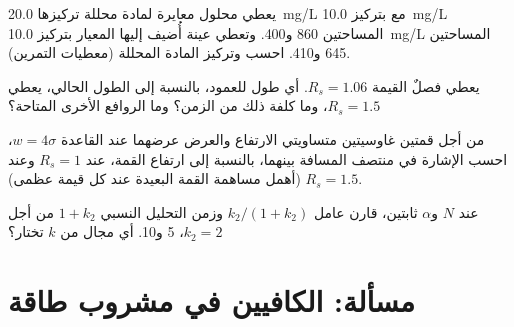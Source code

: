 \begin{exercise}[$\star\star$]\label{exo:b2:chromatography:9}
يعطي محلول معايرة لمادة محللة تركيزها \qty{20.0}{mg/L} مع  بتركيز \qty{10.0}{mg/L}
المساحتين 860 و400. وتعطي عينة أُضيف إليها المعيار بتركيز \qty{10.0}{mg/L} المساحتين 645 و410.
احسب  وتركيز المادة المحللة (معطيات التمرين).
\end{exercise}

\begin{exercise}[$\star\star\star$]\label{exo:b2:chromatography:10}
يعطي فصلٌ القيمة $R_s = 1.06$. أي طول للعمود، بالنسبة إلى الطول الحالي، يعطي $R_s = 1.5$، 
وما كلفة ذلك من الزمن؟ وما الروافع الأخرى المتاحة؟
\end{exercise}

\begin{exercise}[$\star\star\star$]\label{exo:b2:chromatography:11}
من أجل قمتين غاوسيتين متساويتي الارتفاع والعرض عرضهما عند القاعدة $w = 4\sigma$، احسب الإشارة
في منتصف المسافة بينهما، بالنسبة إلى ارتفاع القمة، عند $R_s = 1$ وعند $R_s = 1.5$ (أهمل مساهمة القمة
البعيدة عند كل قيمة عظمى).
\end{exercise}

\begin{exercise}[$\star\star\star$]\label{exo:b2:chromatography:12}
عند $N$ و$\alpha$ ثابتين، قارن عامل  $k_2/(1+k_2)$ وزمن التحليل النسبي
$1 + k_2$ من أجل $k_2 = 2$، 5 و10. أي مجال من $k$ تختار؟
\end{exercise}

\section{مسألة: الكافيين في مشروب طاقة}


